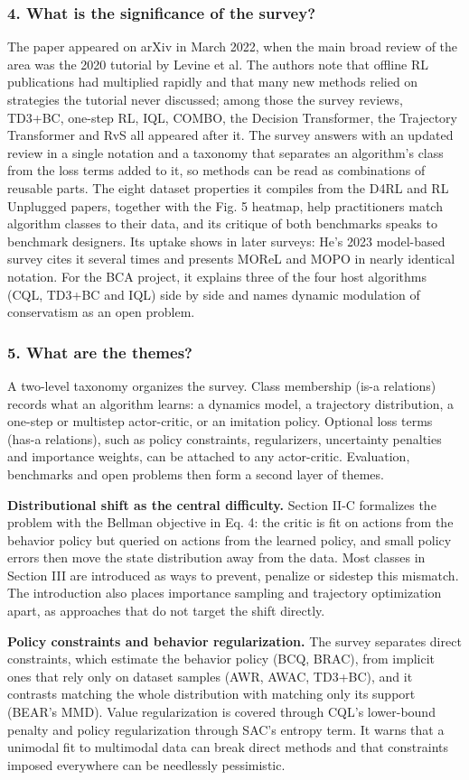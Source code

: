 \documentclass[11pt]{article}
\newcommand{\question}[1]{\subsubsection*{#1}}
\begin{document}
\question{4. What is the significance of the survey?}

The paper appeared on arXiv in March 2022, when the main broad review of the area was the 2020 tutorial by Levine et al. The authors note that offline RL publications had multiplied rapidly and that many new methods relied on strategies the tutorial never discussed; among those the survey reviews, TD3+BC, one-step RL, IQL, COMBO, the Decision Transformer, the Trajectory Transformer and RvS all appeared after it. The survey answers with an updated review in a single notation and a taxonomy that separates an algorithm's class from the loss terms added to it, so methods can be read as combinations of reusable parts. The eight dataset properties it compiles from the D4RL and RL Unplugged papers, together with the Fig. 5 heatmap, help practitioners match algorithm classes to their data, and its critique of both benchmarks speaks to benchmark designers. Its uptake shows in later surveys: He's 2023 model-based survey cites it several times and presents MOReL and MOPO in nearly identical notation. For the BCA project, it explains three of the four host algorithms (CQL, TD3+BC and IQL) side by side and names dynamic modulation of conservatism as an open problem.

\question{5. What are the themes?}

A two-level taxonomy organizes the survey. Class membership (is-a relations) records what an algorithm learns: a dynamics model, a trajectory distribution, a one-step or multistep actor-critic, or an imitation policy. Optional loss terms (has-a relations), such as policy constraints, regularizers, uncertainty penalties and importance weights, can be attached to any actor-critic. Evaluation, benchmarks and open problems then form a second layer of themes.

\textbf{Distributional shift as the central difficulty.} Section II-C formalizes the problem with the Bellman objective in Eq. 4: the critic is fit on actions from the behavior policy but queried on actions from the learned policy, and small policy errors then move the state distribution away from the data. Most classes in Section III are introduced as ways to prevent, penalize or sidestep this mismatch. The introduction also places importance sampling and trajectory optimization apart, as approaches that do not target the shift directly.

\textbf{Policy constraints and behavior regularization.} The survey separates direct constraints, which estimate the behavior policy (BCQ, BRAC), from implicit ones that rely only on dataset samples (AWR, AWAC, TD3+BC), and it contrasts matching the whole distribution with matching only its support (BEAR's MMD). Value regularization is covered through CQL's lower-bound penalty and policy regularization through SAC's entropy term. It warns that a unimodal fit to multimodal data can break direct methods and that constraints imposed everywhere can be needlessly pessimistic.
\end{document}
